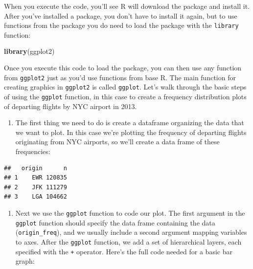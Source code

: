\documentclass[
]{book}
\newenvironment{Shaded}{\begin{snugshade}}{\end{snugshade}}
\newcommand{\CommentTok}[1]{\textcolor[rgb]{0.56,0.35,0.01}{\textit{#1}}}
\newcommand{\FunctionTok}[1]{\textcolor[rgb]{0.13,0.29,0.53}{\textbf{#1}}}
\newcommand{\NormalTok}[1]{#1}
\newcommand{\OtherTok}[1]{\textcolor[rgb]{0.56,0.35,0.01}{#1}}
\newcommand{\SpecialCharTok}[1]{\textcolor[rgb]{0.81,0.36,0.00}{\textbf{#1}}}
\newcommand{\StringTok}[1]{\textcolor[rgb]{0.31,0.60,0.02}{#1}}
\providecommand{\tightlist}{%
  \setlength{\itemsep}{0pt}\setlength{\parskip}{0pt}}
\begin{document}
When you execute the code, you'll see R will download the package and install it. After you've installed a package, you don't have to install it again, but to use functions from the package you do need to load the package with the \texttt{library} function:

\begin{Shaded}
\begin{Highlighting}[]
\FunctionTok{library}\NormalTok{(ggplot2)}
\end{Highlighting}
\end{Shaded}

Once you execute this code to load the package, you can then use any function from \texttt{ggplot2} just as you'd use functions from base R. The main function for creating graphics in \texttt{ggplot2} is called \texttt{ggplot}. Let's walk through the basic steps of using the \texttt{ggplot} function, in this case to create a frequency distribution plots of departing flights by NYC airport in 2013.

\begin{enumerate}
\def\labelenumi{\arabic{enumi}.}
\tightlist
\item
  The first thing we need to do is create a dataframe organizing the data that we want to plot. In this case we're plotting the frequency of departing flights originating from NYC airports, so we'll create a data frame of these frequencies:
\end{enumerate}

\begin{Shaded}
\end{Shaded}

\begin{verbatim}
##   origin      n
## 1    EWR 120835
## 2    JFK 111279
## 3    LGA 104662
\end{verbatim}

\begin{enumerate}
\def\labelenumi{\arabic{enumi}.}
\setcounter{enumi}{1}
\tightlist
\item
  Next we use the \texttt{ggplot} function to code our plot. The first argument in the \texttt{ggplot} function should specify the data frame containing the data (\texttt{origin\_freq}), and we usually include a second argument mapping variables to axes. After the \texttt{ggplot} function, we add a set of hierarchical layers, each specified with the \texttt{+} operator. Here's the full code needed for a basic bar graph:
\end{enumerate}
\end{document}
